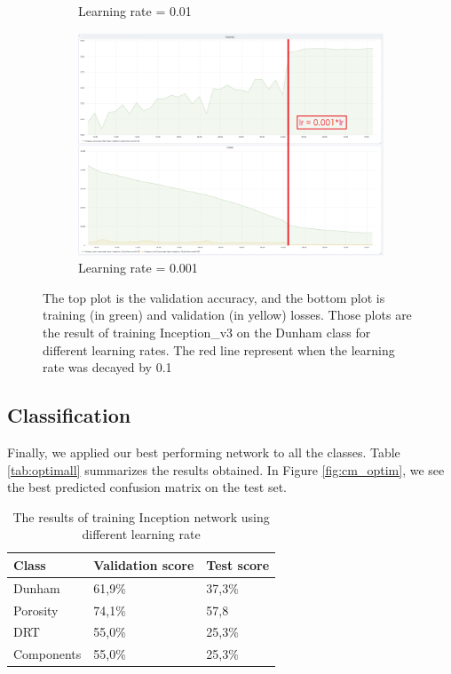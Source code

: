 \begin{figure}
\begin{subfigure}{.6\textwidth}
  \caption{Learning rate = 0.01}
  \label{fig:optin_001}
\end{subfigure}
\begin{subfigure}{.6\textwidth}
  \centering
  \includegraphics[width=1\linewidth]{figures/04-opt_dunham_0001.PNG}
  \caption{Learning rate = 0.001}
  \label{fig:optim_0001}
\end{subfigure}
\label{optimplot}
\caption[Training with different Learning rates]{The top plot is the validation accuracy, and the bottom plot is training (in green) and validation (in yellow) losses. Those plots are the result of training Inception\_v3 on the Dunham class for different learning rates. The red line represent when the learning rate was decayed by 0.1}
\end{figure}
\subsection{Classification}

Finally, we applied our best performing network to all the classes. Table \ref{tab:optimall} summarizes the results obtained. In Figure \ref{fig:cm_optim}, we see the best predicted confusion matrix on the test set.  

\begin{table}
\caption{\label{tab:optimlr} The results of training Inception network using different learning rate}
\centering
\begin{tabular}[b]{| l | l | l |}
\hline
    Class & Validation score  & Test score\\ \hline
    Dunham  &  61,9\%  & 37,3\% \\ \hline
    Porosity & 74,1\% &  57,8\\ \hline
    DRT & 55,0\% &  25,3\% \\ \hline
    Components & 55,0\% &  25,3\% \\ \hline
\end{tabular} 
\end{table}